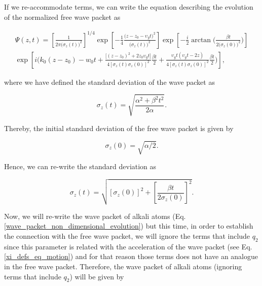 \documentclass{article}
\begin{document}
If we re-accommodate terms, we can write the equation describing the evolution of the normalized free wave packet as

\begin{multline}\label{free_wave_packet_position_space_centered_z0_final_form}
    \Psi (z, t) = \left[\frac{1}{2 \pi \big(\sigma_{z}(t)\big)^2} \right]^{1/4} \exp \left[-\frac{1}{4} \frac{ \big(z - z_{0} - \upsilon_{g} t \big)^{2}}{\big(\sigma_{z}(t)\big)^{2}} \right] \exp \left[-\frac{i}{2} \arctan\Bigg(\frac{\beta t }{2\big(\sigma_{z}(0)\big)^{2}}\Bigg) \right] \\ \exp \left[i \bigg(k_{0}(z-z_{0}) - w_{0}t + \frac{\big[(z - z_{0})^{2} + 2 z_{0} \upsilon_{g} t \big]}{ 4[\sigma_{z}(t)\sigma_{z}(0)]^{2}} \frac{\beta t}{2} + \frac{\upsilon_{g} t (\upsilon_{g} t - 2z)}{4[\sigma_{z}(t)\sigma_{z}(0)]^{2}} \frac{\beta t}{2} \bigg) \right],
\end{multline}

where we have defined the standard deviation of the wave packet as

\begin{equation}
\sigma_{z}(t) = \sqrt{\frac{\alpha^{2} + \beta^{2}t^{2}}{2 \alpha}}.
\end{equation}

Thereby, the initial standard deviation of the free wave packet is given by

\begin{equation}
\sigma_{z}(0) = \sqrt{\alpha / 2}.
\end{equation}

Hence, we can re-write the standard deviation as

\begin{equation}\label{free_wave_packet_width} 
\sigma_{z}(t) = \sqrt{[\sigma_{z}(0)]^{2} + \left[\frac{\beta t}{2 \sigma_{z}(0)} \right]^{2}}.
\end{equation}

Now, we will re-write the wave packet of alkali atoms (Eq. \ref{wave_packet_non_dimensional_evolution}) but this time, in order to establish the connection with the free wave packet, we will ignore the terms that include $q_{2}$ since this parameter is related with the acceleration of the wave packet (see Eq. \ref{xi_defs_eq_motion}) and for that reason those terms does not have an analogue in the free wave packet. Therefore, the wave packet of alkali atoms (ignoring terms that include $q_{2}$) will be given by
\end{document}
